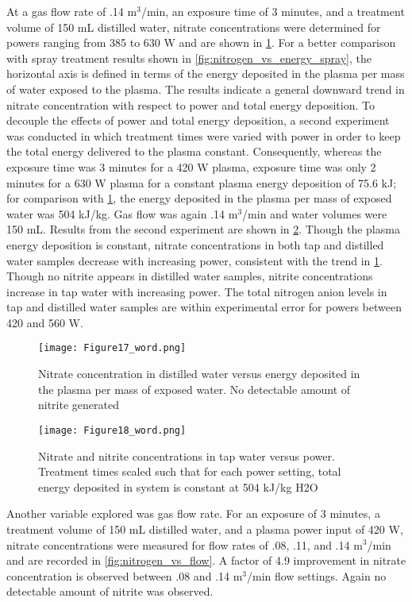At a gas flow rate of .14 m$^3$/min, an exposure time of 3 minutes, and a treatment volume of 150 mL distilled water, nitrate concentrations were determined for powers ranging from 385 to 630 W and are shown in \cref{fig:nitrogen_vs_energy}.  For a better comparison with spray treatment results shown in \cref{fig:nitrogen_vs_energy_spray}, the horizontal axis is defined in terms of the energy deposited in the plasma per mass of water exposed to the plasma.  The results indicate a general downward trend in nitrate concentration with respect to power and total energy deposition.   To decouple the effects of power and total energy deposition, a second experiment was conducted in which treatment times were varied with power in order to keep the total energy delivered to the plasma constant.  Consequently, whereas the exposure time was 3 minutes for a 420 W plasma, exposure time was only 2 minutes for a 630 W plasma for a constant plasma energy deposition of 75.6 kJ; for comparison with \cref{fig:nitrogen_vs_energy}, the energy deposited in the plasma per mass of exposed water was 504 kJ/kg.  Gas flow was again .14 m$^3$/min and water volumes were 150 mL.  Results from the second experiment are shown in \cref{fig:nitrogen_vs_power}.  Though the plasma energy deposition is constant, nitrate concentrations in both tap and distilled water samples decrease with increasing power, consistent with the trend in \cref{fig:nitrogen_vs_energy}.  Though no nitrite appears in distilled water samples, nitrite concentrations increase in tap water with increasing power.  The total nitrogen anion levels in tap and distilled water samples are within experimental error for powers between 420 and 560 W.

\begin{figure}[htbp]
  \centering
  \texttt{[image: Figure17\_word.png]}
  \caption{Nitrate concentration in distilled water versus energy deposited in the plasma per mass of exposed water. No detectable amount of nitrite generated}
  \label{fig:nitrogen_vs_energy}
\end{figure}

\begin{figure}[htbp]
  \centering
  \texttt{[image: Figure18\_word.png]}
  \caption{Nitrate and nitrite concentrations in tap water versus power.  Treatment times scaled such that for each power setting, total energy deposited in system is constant at 504 kJ/kg H2O}
  \label{fig:nitrogen_vs_power}
\end{figure}

Another variable explored was gas flow rate.  For an exposure of 3 minutes, a treatment volume of 150 mL distilled water, and a plasma power input of 420 W, nitrate concentrations were measured for flow rates of .08, .11, and .14 m$^3$/min and are recorded in \cref{fig:nitrogen_vs_flow}.  A factor of 4.9 improvement in nitrate concentration is observed between .08 and .14 m$^3$/min flow settings.  Again no detectable amount of nitrite was observed.

